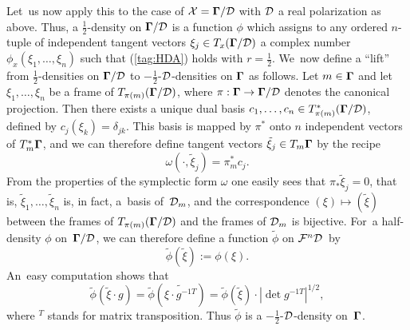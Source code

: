 \documentclass[11pt]{amsart}
\numberwithin{equation}{section}
\theoremstyle{remark}
\newcommand\Omg{{\bigam}}   %
\newcommand\FF{\Cal F}
\newcommand\DD{{\Cal D}}
\newcommand\MD{{\Omg/\DD}}
\newcommand\mhD{$-\tfrac12$-$\DD$}
\newcommand{\bigam}{\mbox{\boldmath $\Gamma$}}
\begin{document}
Let~us now apply this to the case of $\xX=\MD$ with $\DD$ a real polarization
as above. Thus, a $\frac12$-density on $\MD$ is a function $\phi$ which assigns
to any ordered $n$-tuple of independent tangent vectors $\xi_j\in T_x(\MD)$ a
complex number $\phi_x(\xi_1,\dots,\xi_n)$ such that (\ref{tag:HDA}) holds with
$r=\frac12$. We~now define a ``lift'' from $\frac12$-densities on $\MD$ to
\mhD-densities on $\Omg$ as follows. Let $m\in \Omg$ and let
$\xi_1,\dots,\xi_n$ be a frame of $T_{\pi(m)}(\MD)$, where $\pi:\Omg\to\MD$
denotes the canonical projection. Then there exists a unique dual basis
$c_1,\dots,c_n\in T^*_{\pi(m)}(\MD)$, defined by $c_j(\xi_k)=\delta_{jk}$. This
basis is mapped by $\pi^*$ onto $n$ independent vectors of $T^*_m \Omg$, and we
can therefore define tangent vectors $\tilde\xi_j\in T_m \Omg$ by the recipe
$$ \omega(\cdot,\tilde\xi_j)=\pi^*_m c_j.  $$
From the properties of the symplectic form $\omega$ one easily sees that
$\pi_*\tilde\xi_j=0$, that is, $\tilde\xi_1,\dots,\tilde\xi_n$ is, in fact,
a~basis of~$\DD_m$, and the correspondence $(\xi)\mapsto(\tilde\xi)$ between
the frames of $T_{\pi(m)}(\MD)$ and the frames of $\DD_m$ is bijective. For~a
half-density $\phi$ on~$\MD$, we can therefore define a function $\tilde\phi$
on $\FF^n\DD$~by
$$ \tilde\phi(\tilde\xi) := \phi(\xi).  $$
An~easy computation shows that
$$ \tilde\phi(\tilde\xi\cdot g) = \tilde\phi(\widetilde{\xi\cdot g^{-1T}})
= \tilde\phi(\tilde\xi) \cdot|\det g^{-1T}|^{1/2},  $$
where ${}^T$ stands for matrix transposition. Thus $\tilde\phi$ is a
\mhD-density on~$\Omg$.
\end{document}

